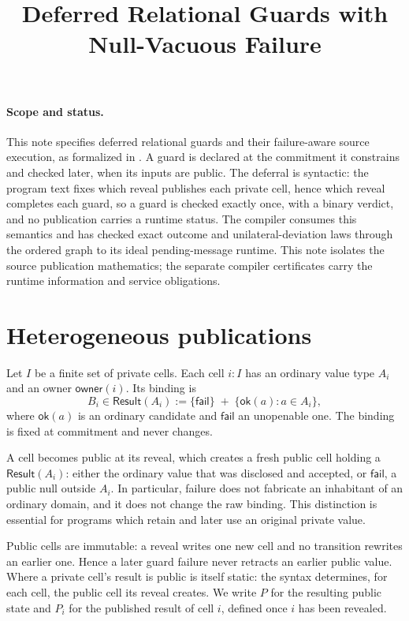 \documentclass[11pt]{article}
\title{Deferred Relational Guards with Null-Vacuous Failure}
\author{}
\date{}
\newcommand{\Failed}{\mathsf{fail}}
\newcommand{\Value}{\mathsf{ok}}
\newcommand{\owner}{\mathsf{owner}}
\newcommand{\lean}[1]{\texttt{\detokenize{#1}}}
\begin{document}
\maketitle

\paragraph{Scope and status.}
This note specifies deferred relational guards and their failure-aware source
execution, as formalized in \lean{Vegas.Source}. A guard is declared at the
commitment it constrains and checked later, when its inputs are public. The
deferral is syntactic: the program text fixes which reveal publishes each
private cell, hence which reveal completes each guard, so a guard is checked
exactly once, with a binary verdict, and no publication carries a runtime
status. The compiler consumes this \lean{SourceProgram} semantics and has
checked exact outcome and unilateral-deviation laws through the ordered graph
to its ideal pending-message runtime. This note isolates the source
publication mathematics; the separate compiler certificates carry the runtime
information and service obligations.

\section{Heterogeneous publications}
\label{sec:publications}

Let $I$ be a finite set of private cells.  Each cell $i:I$ has an ordinary
value type $A_i$ and an owner $\owner(i)$.  Its binding is
\[
  B_i \in \mathsf{Result}(A_i)
      := \{\Failed\}\;\mathbin{+}\;\{\Value(a):a\in A_i\},
\]
where $\Value(a)$ is an ordinary candidate and $\Failed$ an unopenable one.
The binding is fixed at commitment and never changes.

A cell becomes public at its reveal, which creates a fresh public cell holding
a $\mathsf{Result}(A_i)$: either the ordinary value that was disclosed and
accepted, or $\Failed$, a public null outside $A_i$.  In particular, failure
does not fabricate an inhabitant of an ordinary domain, and it does not change
the raw binding.  This distinction is essential for programs which retain and
later use an original private value.

Public cells are immutable: a reveal writes one new cell and no transition
rewrites an earlier one.  Hence a later guard failure never retracts an earlier
public value.  Where a private cell's result is public is itself static: the
syntax determines, for each cell, the public cell its reveal creates.  We write
$P$ for the resulting public state and $P_i$ for the published result of cell
$i$, defined once $i$ has been revealed.
\end{document}
